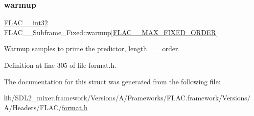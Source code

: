 \subsubsection{\texorpdfstring{warmup}{warmup}}
{\footnotesize\ttfamily \mbox{\hyperlink{ordinals_8h_a33fd77bfe6d685541a0c034a75deccdc}{F\+L\+A\+C\+\_\+\+\_\+int32}} F\+L\+A\+C\+\_\+\+\_\+\+Subframe\+\_\+\+Fixed\+::warmup\mbox{[}\mbox{\hyperlink{group__flac__format_gabd0d5d6fe71b337244712b244ae7cb0f}{F\+L\+A\+C\+\_\+\+\_\+\+M\+A\+X\+\_\+\+F\+I\+X\+E\+D\+\_\+\+O\+R\+D\+ER}}\mbox{]}}

Warmup samples to prime the predictor, length == order. 

Definition at line 305 of file format.\+h.



The documentation for this struct was generated from the following file\+:\begin{DoxyCompactItemize}
\item 
lib/\+S\+D\+L2\+\_\+mixer.\+framework/\+Versions/\+A/\+Frameworks/\+F\+L\+A\+C.\+framework/\+Versions/\+A/\+Headers/\+F\+L\+A\+C/\mbox{\hyperlink{format_8h}{format.\+h}}\end{DoxyCompactItemize}
